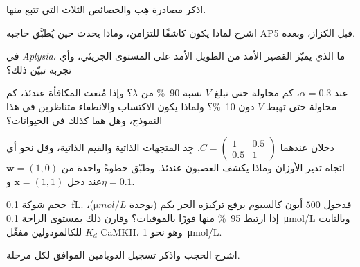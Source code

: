 \begin{exercise}[$\star$]\label{exo:b3:learning-memory:2}
اذكر مصادرة هِب والخصائص الثلاث  التي
تتبع منها.
\end{exercise}

\begin{exercise}[$\star$]\label{exo:b3:learning-memory:3}
اشرح لماذا يكون  كاشفًا للتزامن، وماذا يحدث
 حين يُطبَّق حاجبه AP5 قبل الكزاز، وبعده.
\end{exercise}

\begin{exercise}[$\star$]\label{exo:b3:learning-memory:4}
في \emph{Aplysia}، ما الذي يميّز  القصير الأمد من
الطويل الأمد على المستوى الجزيئي، وأي تجربة تبيّن ذلك؟
\end{exercise}

\begin{exercise}[$\star\star$]\label{exo:b3:learning-memory:5}
عند $\alpha = 0.3$، كم محاولة حتى تبلغ $V$ نسبة \qty{90}{\%} من
$\lambda$؟ وإذا مُنعت المكافأة عندئذ، كم محاولة حتى تهبط $V$
دون \qty{10}{\%}؟ ولماذا يكون الاكتساب والانطفاء متناظرين في
هذا النموذج، وهل هما كذلك في الحيوانات؟
\end{exercise}

\begin{exercise}[$\star\star$]\label{exo:b3:learning-memory:6}
دخلان عندهما $C = \begin{pmatrix}1 & 0.5\\ 0.5 & 1\end{pmatrix}$.
جِد المتجهات الذاتية والقيم الذاتية، وقل نحو أي اتجاه تدير
 الأوزان وماذا يكشف العصبون عندئذ. وطبّق  خطوةً واحدة من $\mathbf{w} = (1,0)$ عند دخل $\mathbf{x}
= (1,1)$ و$\eta = 0.1$.
\end{exercise}

\begin{exercise}[$\star\star$]\label{exo:b3:learning-memory:7}
حجم شوكة \qty{0.1}{fL}. فدخول $500$ أيون كالسيوم يرفع تركيزه
الحر بكم (بوحدة $\unit{\micro mol/L}$)، إذا ارتبط
\qty{95}{\%} منها فورًا بالموقيات؟ وقارن ذلك بمستوى الراحة
\qty{0.1}{\micro mol/L} وبالثابت $K_{d}$ للكالمودولين مفعِّل
CaMKII، وهو نحو \qty{1}{\micro mol/L}.
\end{exercise}

\begin{exercise}[$\star\star$]\label{exo:b3:learning-memory:8}
اشرح الحجب  واذكر تسجيل الدوبامين
الموافق لكل مرحلة.
\end{exercise}

